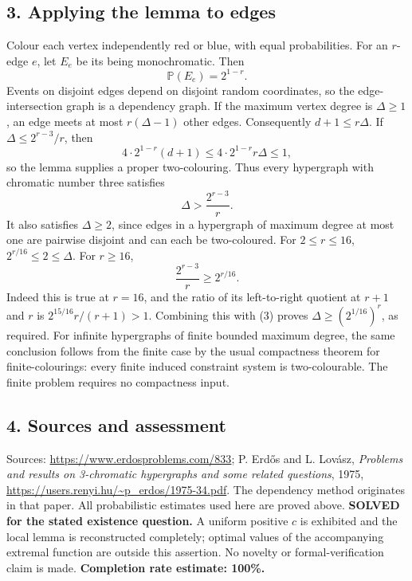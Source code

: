\subsection*{3. Applying the lemma to edges}
Colour each vertex independently red or blue, with equal probabilities. For an $r$-edge $e$, let $E_e$ be its being monochromatic. Then
\[
 \mathbb P(E_e)=2^{1-r}.
\]
Events on disjoint edges depend on disjoint random coordinates, so the edge-intersection graph is a dependency graph. If the maximum vertex degree is $\Delta\ge1$, an edge meets at most $r(\Delta-1)$ other edges. Consequently $d+1\le r\Delta$.
If $\Delta\le2^{r-3}/r$, then
\[
 4\cdot2^{1-r}(d+1)\le4\cdot2^{1-r}r\Delta\le1,
\]
so the lemma supplies a proper two-colouring. Thus every hypergraph with chromatic number three satisfies
\[
 \Delta>\frac{2^{r-3}}r.                                 \tag{3}
\]
It also satisfies $\Delta\ge2$, since edges in a hypergraph of maximum degree at most one are pairwise disjoint and can each be two-coloured.
For $2\le r\le16$, $2^{r/16}\le2\le\Delta$. For $r\ge16$,
\[
 \frac{2^{r-3}}r\ge2^{r/16}.
\]
Indeed this is true at $r=16$, and the ratio of its left-to-right quotient at $r+1$ and $r$ is $2^{15/16}r/(r+1)>1$. Combining this with (3) proves $\Delta\ge(2^{1/16})^r$, as required.
For infinite hypergraphs of finite bounded maximum degree, the same conclusion follows from the finite case by the usual compactness theorem for finite-colourings: every finite induced constraint system is two-colourable. The finite problem requires no compactness input.
\subsection*{4. Sources and assessment}
Sources: \url{https://www.erdosproblems.com/833}; P. Erd\H{o}s and L. Lov\'asz, \emph{Problems and results on 3-chromatic hypergraphs and some related questions}, 1975, \url{https://users.renyi.hu/~p_erdos/1975-34.pdf}. The dependency method originates in that paper. All probabilistic estimates used here are proved above.
\textbf{SOLVED for the stated existence question.} A uniform positive $c$ is exhibited and the local lemma is reconstructed completely; optimal values of the accompanying extremal function are outside this assertion. No novelty or formal-verification claim is made.
\textbf{Completion rate estimate: 100\%.}
